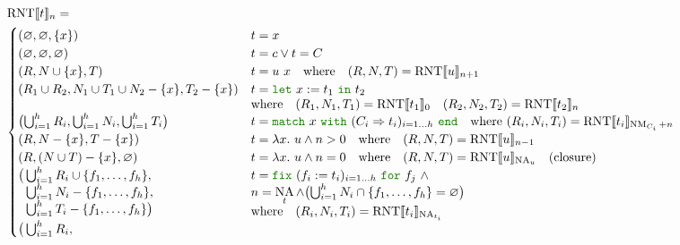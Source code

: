 \documentclass[a4paper,fleqn]{article}
\newcommand{\kwlet}{\mbox{\color{mygreen}\ttfamily let}}
\newcommand{\kwin}{\mbox{\color{mygreen}\ttfamily in}}
\newcommand{\kwmatch}{\mbox{\color{mygreen}\ttfamily match}}
\newcommand{\kwwith}{\mbox{\color{mygreen}\ttfamily with}}
\newcommand{\kwend}{\mbox{\color{mygreen}\ttfamily end}}
\newcommand{\kwfix}{\mbox{\color{mygreen}\ttfamily fix}}
\newcommand{\kwfor}{\mbox{\color{mygreen}\ttfamily for}}
\newcommand{\lam}[2]{\lambda #1.~#2}
\newcommand{\letin}[3]{\kwlet~#1:=#2~\kwin~#3}
\newcommand{\match}[4]{\kwmatch~#1~\kwwith~(#2 \Rightarrow #3)_{#4}~\kwend}
\newcommand{\fix}[4]{\kwfix~(#1 := #2)_{#3}~\kwfor~#4}
\DeclareMathOperator{\NA}{NA}
\DeclareMathOperator{\NM}{NM}
\newcommand{\BRA}[1]{\llbracket #1 \rrbracket}
\DeclareMathOperator{\RNTop}{RNT}
\newcommand{\RNT}[2]{\RNTop\BRA{#1}_{#2}}
\begin{document}
\begin{align*}
  &\RNT{t}{n} = \\
  &\begin{cases}
    (\varnothing, \varnothing, \{x\})             & t = x \\
    (\varnothing, \varnothing, \varnothing)         & t = c \vee t = C \\
    (R, N \cup \{x\}, T)         & t = u~x \quad \text{where}\quad (R,N,T) = \RNT{u}{n+1} \\
    (R_1 \cup R_2, N_1 \cup T_1 \cup N_2 - \{x\}, T_2 - \{x\})        &
      \begin{aligned}[t]
        & t = \letin{x}{t_1}{t_2} \\
        & \text{where}\quad (R_1,N_1,T_1) = \RNT{t_1}{0} \quad (R_2,N_2,T_2) = \RNT{t_2}{n}
      \end{aligned} \\
    \bigl(\bigcup_{i=1}^h R_i, \bigcup_{i=1}^h N_i, \bigcup_{i=1}^h T_i \bigr)         & t = \match{x}{C_i}{t_i}{i=1\dots h} \quad\text{where}~(R_i, N_i, T_i) = \RNT{t_i}{\NM_{C_i}+n} \\
    (R, N-\{x\}, T - \{x\})                                           & t = \lam{x}{u} \wedge n > 0 \quad \text{where}\quad  (R, N, T) = \RNT{u}{n-1} \\
    (R, (N \cup T) - \{x\}, \varnothing)                             & t = \lam{x}{u} \wedge n = 0 \quad \text{where}\quad  (R, N, T) = \RNT{u}{\NA_u} \quad \text{(closure)} \\
    \begin{aligned}[t]
      \bigl( & \textstyle\bigcup_{i=1}^h R_i \cup \{f_1,\dots, f_h\}, \\
             & \textstyle\bigcup_{i=1}^h N_i - \{f_1,\dots, f_h\}, \\
             & \textstyle\bigcup_{i=1}^h T_i - \{f_1,\dots, f_h\} \bigr)
    \end{aligned} &
      \begin{aligned}[t]
        & t = \fix{f_i}{t_i}{i=1\dots h}{f_j} ~\wedge \\
        & n = \NA_t \wedge \bigl(\textstyle\bigcup_{i=1}^h N_i \cap \{f_1,\dots, f_h\} = \varnothing\bigr) \\
        & \text{where}\quad (R_i, N_i, T_i) = \RNT{t_i}{\NA_{t_i}}
      \end{aligned} \\
    \begin{aligned}[t]
      \bigl( & \textstyle\bigcup_{i=1}^h R_i, \\

\end{aligned}
\end{cases}
\end{align*}
\end{document}

